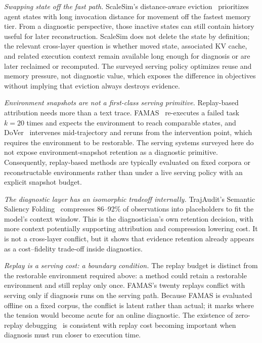 \emph{Swapping state off the fast path.} ScaleSim's distance-aware eviction~\cite{zhou2026} prioritizes agent states with long invocation distance for movement off the fastest memory tier. From a diagnostic perspective, those inactive states can still contain history useful for later reconstruction. ScaleSim does not delete the state by definition; the relevant cross-layer question is whether moved state, associated KV cache, and related execution context remain available long enough for diagnosis or are later reclaimed or recomputed. The surveyed serving policy optimizes reuse and memory pressure, not diagnostic value, which exposes the difference in objectives without implying that eviction always destroys evidence.

\emph{Environment snapshots are not a first-class serving primitive.} Replay-based attribution needs more than a text trace. FAMAS~\cite{famas2025} re-executes a failed task $k=20$ times and expects the environment to reach comparable states, and DoVer~\cite{dover2026} intervenes mid-trajectory and reruns from the intervention point, which requires the environment to be restorable. The serving systems surveyed here do not expose environment-snapshot retention as a diagnostic primitive. Consequently, replay-based methods are typically evaluated on fixed corpora or reconstructable environments rather than under a live serving policy with an explicit snapshot budget.

\emph{The diagnostic layer has an isomorphic tradeoff internally.} TrajAudit's Semantic Saliency Folding~\cite{trajaudit2026} compresses 86--92\% of observations into placeholders to fit the model's context window. This is the diagnostician's own retention decision, with more context potentially supporting attribution and compression lowering cost. It is not a cross-layer conflict, but it shows that evidence retention already appears as a cost--fidelity trade-off inside diagnostics.

\emph{Replay is a serving cost: a boundary condition.} The replay budget is distinct from the restorable environment required above: a method could retain a restorable environment and still replay only once. FAMAS's twenty replays conflict with serving only if diagnosis runs on the serving path. Because FAMAS is evaluated offline on a fixed corpus, the conflict is latent rather than actual; it marks where the tension would become acute for an online diagnostic. The existence of zero-replay debugging~\cite{zeroreplay2026} is consistent with replay cost becoming important when diagnosis must run closer to execution time.

